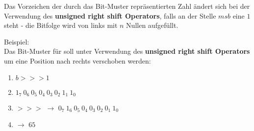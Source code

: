 \begin{tcolorbox}
    Das Vorzeichen der durch das Bit-Muster repräsentierten Zahl ändert sich bei der Verwendung des \textbf{unsigned right shift Operators}, falls an der Stelle $msb$ eine $1$ steht - die Bitfolge wird von links mit $n$ Nullen aufgefüllt.
\end{tcolorbox}

\noindent
Beispiel:\\
Das Bit-Muster für  soll unter Verwendung des \textbf{unsigned right shift Operators} um eine Position nach rechts verschoben werden:

\begin{enumerate}
    \item[] $b >>> 1$
    \item $1_7\ 0_6\ 0_5\ 0_4\ 0_3\ 0_2\ 1_1\ 1_0$
    \item $>>>$ $\rightarrow$ $0_7\ 1_6\ 0_5\ 0_4\ 0_3\ 0_2\ 0_1\ 1_0$
    \item[]   $\rightarrow$ $65$
\end{enumerate}\\

